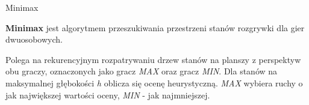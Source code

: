 \begin{frame}{Minimax}

  {\large
  \textbf{Minimax} jest algorytmem przeszukiwania przestrzeni stanów rozgrywki dla gier dwuosobowych.
  }

  \begin{itemize}
    \myitem Polega na rekurencyjnym rozpatrywaniu drzew stanów na planszy z perspektyw obu graczy, oznaczonych jako gracz \textit{MAX} oraz gracz \textit{MIN}.
    \myitem Dla stanów na maksymalnej głębokości \textit{h} oblicza się ocenę heurystyczną.
    \myitem \textit{MAX} wybiera ruchy o jak największej wartości oceny, \textit{MIN} - jak najmniejszej.
  \end{itemize}
  
    







\end{frame}
